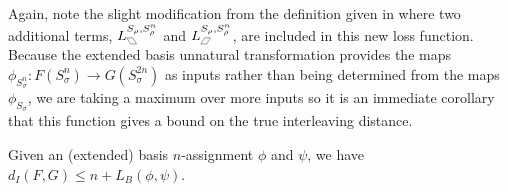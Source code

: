 Again, note the slight modification from the definition given in  \cite{chambers2023bounding} where two additional terms, $\Lpl^{S_\rho, S_\rho^n}$ and $\Lpr^{S_\rho, S_\rho^n}$, are included in this new loss function. 
Because the extended basis unnatural transformation provides the maps 
$\phi_{S_\sigma^n}\colon F(S_\sigma^n) \to G(S_\sigma^{2n})$ as inputs rather than being determined from the maps $\phi_{S_\sigma}$, we are taking a maximum over more inputs so it is an immediate corollary that this function gives a bound on the true interleaving distance. 

\begin{theorem}
\label{maintheorem}
Given an (extended) basis $n$-assignment  
$\phi$
and 
$\psi$, 
we have 
$d_I(F,G) \leq n + L_B(\phi,\psi).$
\end{theorem}
